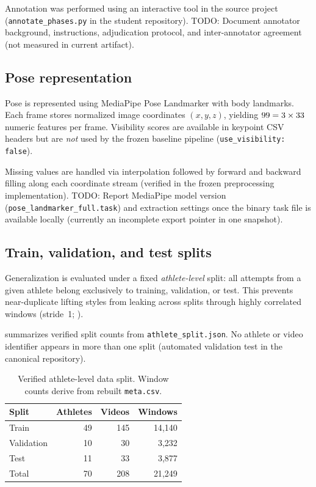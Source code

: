 Annotation was performed using an interactive tool in the source project (\texttt{annotate\_phases.py} in the student repository).
\textsc{TODO:} Document annotator background, instructions, adjudication protocol, and inter-annotator agreement (not measured in current artifact).

\subsection{Pose representation}
\label{sec:dataset:pose}

Pose is represented using MediaPipe Pose Landmarker with \numlandmarks{} body landmarks.
Each frame stores normalized image coordinates $(x, y, z)$, yielding $99 = 3 \times 33$ numeric features per frame.
Visibility scores are available in keypoint CSV headers but are \emph{not} used by the frozen baseline pipeline (\texttt{use\_visibility: false}).

Missing values are handled via interpolation followed by forward and backward filling along each coordinate stream (verified in the frozen preprocessing implementation).
\textsc{TODO:} Report MediaPipe model version (\texttt{pose\_landmarker\_full.task}) and extraction settings once the binary task file is available locally (currently an incomplete export pointer in one snapshot).

\subsection{Train, validation, and test splits}
\label{sec:dataset:splits}

Generalization is evaluated under a fixed \emph{athlete-level} split: all attempts from a given athlete belong exclusively to training, validation, or test.
This prevents near-duplicate lifting styles from leaking across splits through highly correlated windows (stride~1; ).

 summarizes verified split counts from \texttt{athlete\_split.json}.
No athlete or video identifier appears in more than one split (automated validation test in the canonical repository).

\begin{table}[t]
  \centering
  \caption{Verified athlete-level data split. Window counts derive from rebuilt \texttt{meta.csv}.}
  \label{tab:split_stats}
  \begin{tabular}{lrrr}
    \toprule
    Split & Athletes & Videos & Windows \\
    \midrule
    Train & 49 & 145 & 14{,}140 \\
    Validation & 10 & 30 & 3{,}232 \\
    Test & 11 & 33 & 3{,}877 \\
    \midrule
    Total & 70 & 208 & 21{,}249 \\
    \bottomrule
  \end{tabular}
\end{table}

